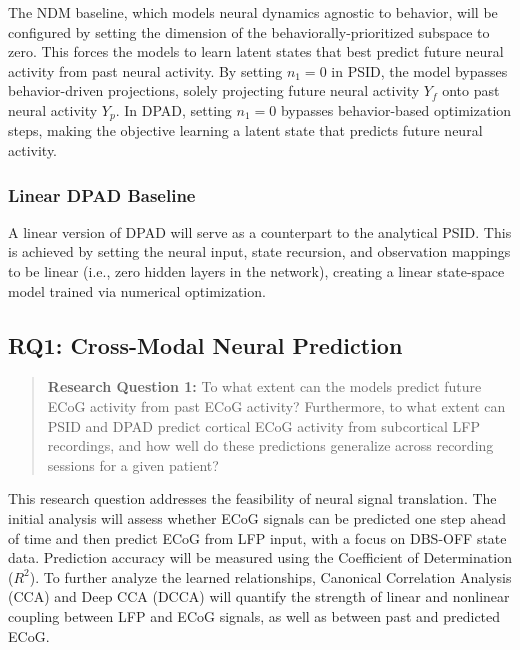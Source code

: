 \documentclass[12pt, letterpaper]{article}
\begin{document}
The NDM baseline, which models neural dynamics agnostic to behavior, will be configured by setting the dimension of the behaviorally-prioritized subspace to zero. This forces the models to learn latent states that best predict future neural activity from past neural activity. By setting $n_1 = 0$ in PSID, the model bypasses behavior-driven projections, solely projecting future neural activity $Y_f$ onto past neural activity $Y_p$. In DPAD, setting $n_1 = 0$ bypasses behavior-based optimization steps, making the objective learning a latent state that predicts future neural activity.

\subsubsection{Linear DPAD Baseline}

A linear version of DPAD will serve as a counterpart to the analytical PSID. This is achieved by setting the neural input, state recursion, and observation mappings to be linear (i.e., zero hidden layers in the network), creating a linear state-space model trained via numerical optimization.

\subsection{RQ1: Cross-Modal Neural Prediction}

\begin{quote}

    \textbf{Research Question 1:} To what extent can the models predict future ECoG activity from past ECoG activity? Furthermore, to what extent can PSID and DPAD predict cortical ECoG activity from subcortical LFP recordings, and how well do these predictions generalize across recording sessions for a given patient?

\end{quote}

This research question addresses the feasibility of neural signal translation. The initial analysis will assess whether ECoG signals can be predicted one step ahead of time and then predict ECoG from LFP input, with a focus on DBS-OFF state data. Prediction accuracy will be measured using the Coefficient of Determination ($R^2$). To further analyze the learned relationships, Canonical Correlation Analysis (CCA) and Deep CCA (DCCA) will quantify the strength of linear and nonlinear coupling between LFP and ECoG signals, as well as between past and predicted ECoG.
\end{document}
